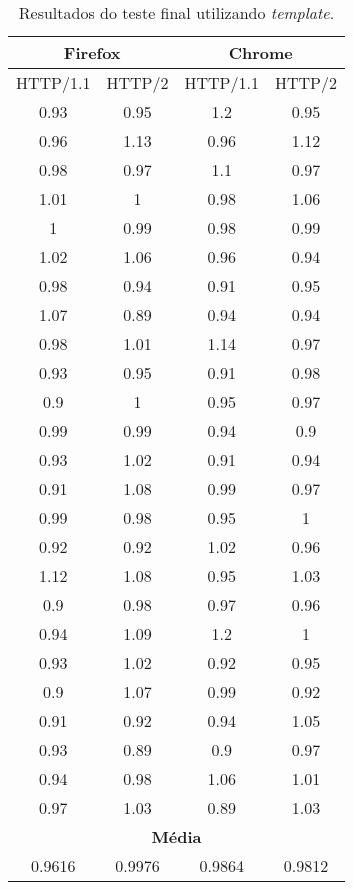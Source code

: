 \begin{table}[h]
	\centering
	\caption{Resultados do teste final utilizando \textit{template}.}
	\label{resultados-template}
	\begin{tabular}{cccc}
		\hline
		\multicolumn{2}{c}{\textbf{Firefox}} & \multicolumn{2}{c}{\textbf{Chrome}} \\
		\hline
		HTTP/1.1 & HTTP/2 & HTTP/1.1 & HTTP/2 \\
		\hline
		0.93 & 0.95 & 1.2 & 0.95 \\
		0.96 & 1.13 & 0.96 & 1.12 \\
		0.98 & 0.97 & 1.1 & 0.97 \\
		1.01 & 1 & 0.98 & 1.06 \\
		1   & 0.99 & 0.98 & 0.99 \\
		1.02 & 1.06 & 0.96 & 0.94 \\
		0.98 & 0.94 & 0.91 & 0.95 \\
		1.07 & 0.89 & 0.94 & 0.94 \\
		0.98 & 1.01 & 1.14 & 0.97 \\
		0.93 & 0.95 & 0.91 & 0.98 \\
		0.9 & 1 & 0.95 & 0.97 \\
		0.99 & 0.99 & 0.94 & 0.9  \\
		0.93 & 1.02 & 0.91 & 0.94 \\
		0.91 & 1.08 & 0.99 & 0.97 \\
		0.99 & 0.98 & 0.95 & 1    \\
		0.92 & 0.92 & 1.02 & 0.96 \\
		1.12 & 1.08 & 0.95 & 1.03 \\
		0.9 & 0.98 & 0.97 & 0.96 \\
		0.94 & 1.09 & 1.2 & 1    \\
		0.93 & 1.02 & 0.92 & 0.95 \\
		0.9 & 1.07 & 0.99 & 0.92 \\
		0.91 & 0.92 & 0.94 & 1.05 \\
		0.93 & 0.89 & 0.9 & 0.97 \\
		0.94 & 0.98 & 1.06 & 1.01 \\
		0.97 & 1.03 & 0.89 & 1.03 \\
		\hline
		\multicolumn{4}{c}{\textbf{Média}} \\
		0.9616 & 0.9976 & 0.9864 & 0.9812 \\
		\hline
	\end{tabular}
\end{table}